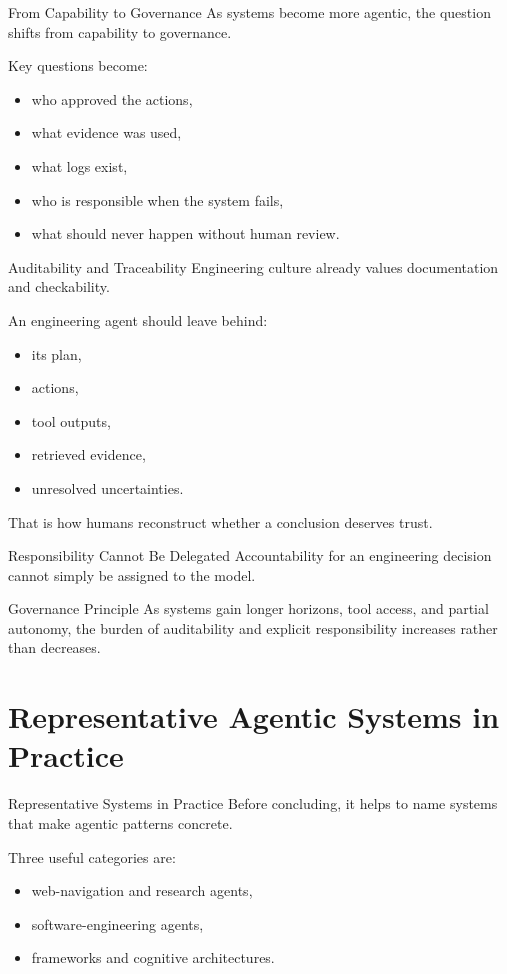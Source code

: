 \documentclass[12pt]{beamer}
\begin{document}
\begin{frame}{From Capability to Governance}
  As systems become more agentic, the question shifts from capability to governance.

  Key questions become:
  \begin{itemize}
    \item who approved the actions,
    \item what evidence was used,
    \item what logs exist,
    \item who is responsible when the system fails,
    \item what should never happen without human review.
  \end{itemize}
\end{frame}

\begin{frame}{Auditability and Traceability}
  Engineering culture already values documentation and checkability.

  An engineering agent should leave behind:
  \begin{itemize}
    \item its plan,
    \item actions,
    \item tool outputs,
    \item retrieved evidence,
    \item unresolved uncertainties.
  \end{itemize}

  That is how humans reconstruct whether a conclusion deserves trust.
\end{frame}

\begin{frame}{Responsibility Cannot Be Delegated}
  Accountability for an engineering decision cannot simply be assigned to the model.

  \begin{conceptbox}{Governance Principle}
    As systems gain longer horizons, tool access, and partial autonomy, the burden of auditability and explicit responsibility increases rather than decreases.
  \end{conceptbox}
\end{frame}

\section{Representative Agentic Systems in Practice}

\begin{frame}{Representative Systems in Practice}
  Before concluding, it helps to name systems that make agentic patterns concrete.

  Three useful categories are:
  \begin{itemize}
    \item web-navigation and research agents,
    \item software-engineering agents,
    \item frameworks and cognitive architectures.
  \end{itemize}
\end{frame}
\end{document}
